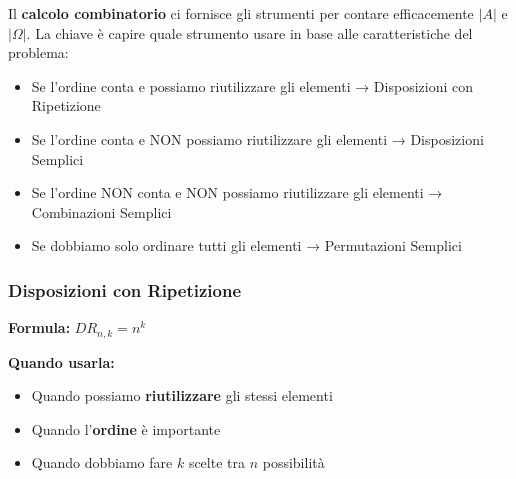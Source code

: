 Il \textbf{calcolo combinatorio} ci fornisce gli strumenti per contare efficacemente $|A|$ e $|\Omega|$. La chiave è capire quale strumento usare in base alle caratteristiche del problema:
\begin{itemize}
    \item Se l'ordine conta e possiamo riutilizzare gli elementi → Disposizioni con Ripetizione
    \item Se l'ordine conta e NON possiamo riutilizzare gli elementi → Disposizioni Semplici
    \item Se l'ordine NON conta e NON possiamo riutilizzare gli elementi → Combinazioni Semplici
    \item Se dobbiamo solo ordinare tutti gli elementi → Permutazioni Semplici
\end{itemize}

\subsubsection{Disposizioni con Ripetizione}
\textbf{Formula:} $DR_{n,k} = n^k$

\textbf{Quando usarla:}
\begin{itemize}
    \item Quando possiamo \textbf{riutilizzare} gli stessi elementi
    \item Quando l'\textbf{ordine} è importante
    \item Quando dobbiamo fare $k$ scelte tra $n$ possibilità
\end{itemize}

